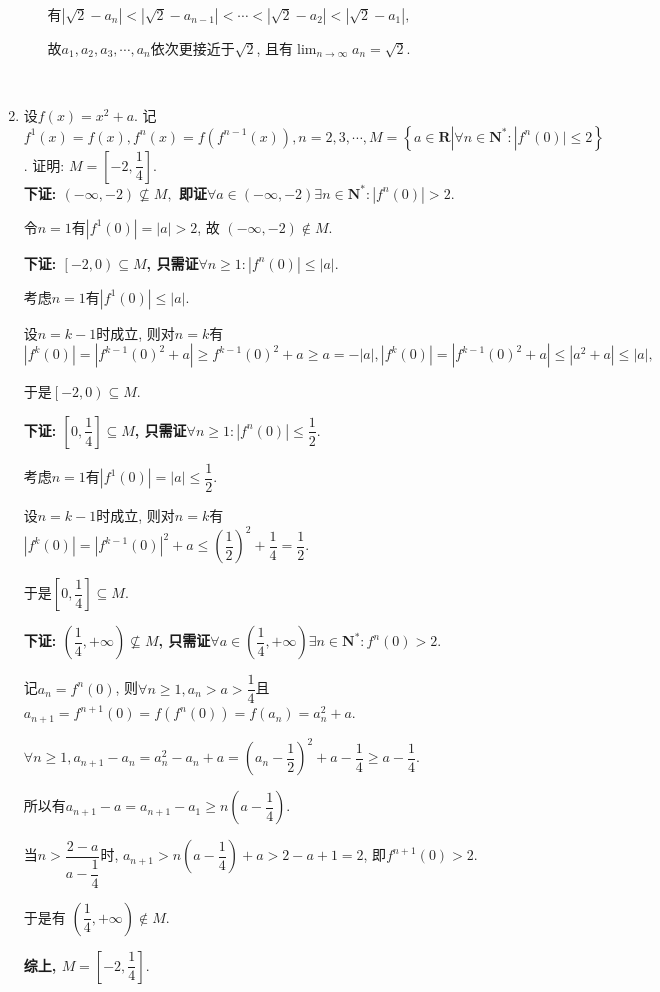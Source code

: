 \documentclass[8pt]{article}
\begin{document}
\begin{enumerate}[label=(\arabic*)]
\begin{enumerate}[label=(\arabic*)]
					有$|\sqrt{2}-a_n|<|\sqrt{2}-a_{n-1}|<\cdots<|\sqrt{2}-a_2|<|\sqrt{2}-a_1|,$

					故$a_1, a_2, a_3, \cdots, a_n$依次更接近于$\sqrt{2}$, 且有$\displaystyle \lim_{n\rightarrow \infty} a_n = \sqrt{2}.$
			\end{enumerate}

		~\\

		\item 设$f(x)=x^2+a$. 记$f^{1}(x)=f(x), f^{n}(x)=f(f^{n-1}(x)), n=2, 3, \cdots, M=\left\{a\in\mathbf{R}|\forall n\in\mathbf{N}^{*}: |f^{n}(0)|\leq 2\right\}$. 证明: $M=\left[-2, \dfrac{1}{4}\right].$
			~\\

			\textbf{下证: $(-\infty, -2) \nsubseteq M,$ 即证$\forall a\in (-\infty, -2) \exists n\in \mathbf{N}^{*}: |f^{n}(0)|>2.$}

			令$n=1$有$|f^{1}(0)|=|a|>2$, 故 $(-\infty, -2) \notin M.$

			\textbf{下证: $\left[-2, 0\right) \subseteq M$, 只需证$\forall n\geq 1: |f^{n}(0)| \leq |a|.$}

			考虑$n=1$有$|f^{1}(0)|\leq |a|.$

			设$n=k-1$时成立, 则对$n=k$有$|f^{k}(0)|=|f^{k-1}(0)^2+a|\geq f^{k-1}(0)^2+a \geq a=-|a|, |f^{k}(0)|=|f^{k-1}(0)^2+a|\leq |a^2+a|\leq |a|,$

			于是$\left[-2, 0\right) \subseteq M$.

			\textbf{下证: $\left[0, \dfrac{1}{4}\right] \subseteq M$, 只需证$\forall n\geq 1: |f^{n}(0)|\leq \dfrac{1}{2}.$}

			考虑$n=1$有$|f^{1}(0)|=|a|\leq \dfrac{1}{2}.$

			设$n=k-1$时成立, 则对$n=k$有$|f^{k}(0)|=|f^{k-1}(0)|^2+a\leq \left(\dfrac{1}{2}\right)^2+\dfrac{1}{4}=\dfrac{1}{2}.$

			于是$\left[0, \dfrac{1}{4}\right] \subseteq M$.

			\textbf{下证: $\left(\dfrac{1}{4}, +\infty\right) \nsubseteq M$, 只需证$\forall a\in \left(\dfrac{1}{4}, +\infty\right) \exists n\in \mathbf{N}^{*}: f^{n}(0)>2.$}

			记$a_n = f^{n}(0)$, 则$\forall n\geq 1, a_n > a > \dfrac{1}{4}$且$a_{n+1}=f^{n+1}(0)=f(f^n(0))=f(a_n)=a_n^2+a$.

			$\forall n\geq 1, a_{n+1}-a_{n}=a_n^2-a_n+a=\left(a_n-\dfrac{1}{2}\right)^2+a-\dfrac{1}{4}\geq a-\dfrac{1}{4}.$

			所以有$a_{n+1}-a=a_{n+1}-a_1\geq n\left(a-\dfrac{1}{4}\right)$.

			当$n>\dfrac{2-a}{a-\dfrac{1}{4}}$时, $a_{n+1}>n\left(a-\dfrac{1}{4}\right)+a>2-a+1=2$, 即$f^{n+1}(0)>2$.

			于是有 $\left(\dfrac{1}{4}, +\infty\right) \notin M.$

			\textbf{综上, $M=\left[-2, \dfrac{1}{4}\right].$}

	\end{enumerate}
\end{document}
